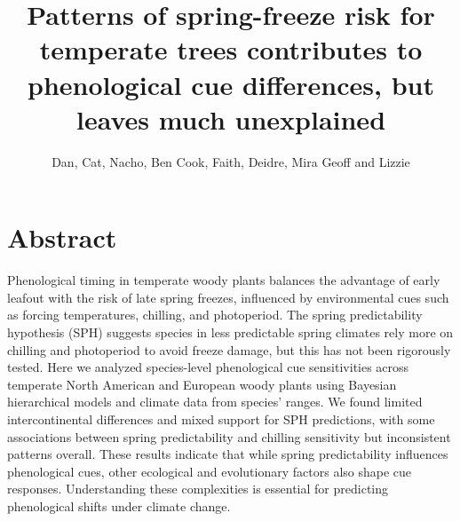 \documentclass[12pt]{article}
\title{
Patterns of spring-freeze risk for temperate trees contributes to phenological cue differences, but leaves much unexplained\\
}
\author{Dan, Cat, Nacho, Ben Cook, Faith, Deidre, Mira Geoff and Lizzie}
\begin{document}

\maketitle

\section*{Abstract} 


Phenological timing in temperate woody plants balances the advantage of early leafout with the risk of late spring freezes, influenced by environmental cues such as forcing temperatures, chilling, and photoperiod. The spring predictability hypothesis (SPH) suggests species in less predictable spring climates rely more on chilling and photoperiod to avoid freeze damage, but this has not been rigorously tested. Here we analyzed species-level phenological cue sensitivities across temperate North American and European woody plants using Bayesian hierarchical models and climate data from species' ranges. We found limited intercontinental differences and mixed support for SPH predictions, with some associations between spring predictability and chilling sensitivity but inconsistent patterns overall. These results indicate that while spring predictability influences phenological cues, other ecological and evolutionary factors also shape cue responses. Understanding these complexities is essential for predicting phenological shifts under climate change.
\end{document}
